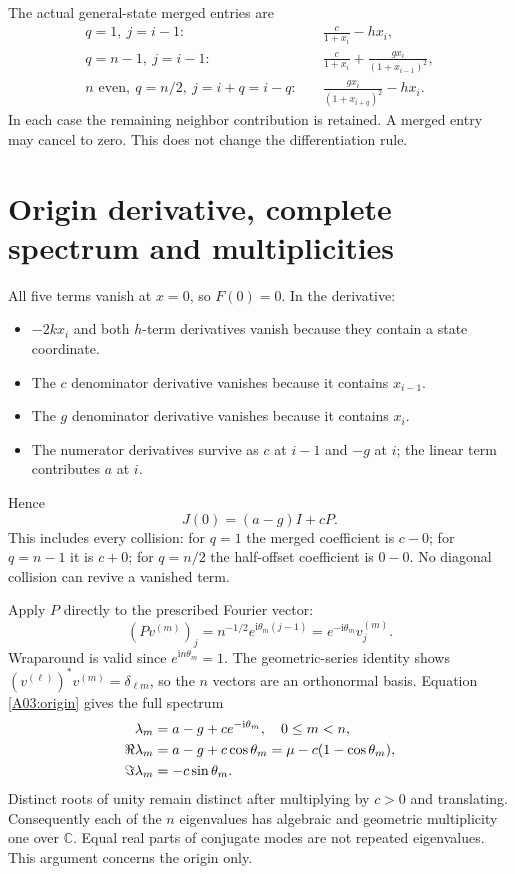 \documentclass[11pt]{article}
\newcommand{\CC}{\mathbb C}
\begin{document}
The actual general-state merged entries are
\begin{align*}
 q=1,\ j=i-1:&\quad \frac{c}{1+x_i}-h x_i,\\
 q=n-1,\ j=i-1:&\quad
              \frac{c}{1+x_i}+\frac{g x_i}{(1+x_{i-1})^2},\\
 n\text{ even},\ q=n/2,\ j=i+q=i-q:&\quad
              \frac{g x_i}{(1+x_{i+q})^2}-h x_i.
\end{align*}
In each case the remaining neighbor contribution is retained. A merged entry
may cancel to zero. This does not change the differentiation rule.

\section{Origin derivative, complete spectrum and multiplicities}
All five terms vanish at $x=0$, so $F(0)=0$. In the derivative:
\begin{itemize}
\item $-2kx_i$ and both $h$-term derivatives vanish because they contain a state coordinate.
\item The $c$ denominator derivative vanishes because it contains $x_{i-1}$.
\item The $g$ denominator derivative vanishes because it contains $x_i$.
\item The numerator derivatives survive as $c$ at $i-1$ and $-g$ at $i$; the linear term contributes $a$ at $i$.
\end{itemize}
Hence
\begin{equation}
 J(0)=(a-g)I+cP.\label{A03:origin}
\end{equation}
This includes every collision: for $q=1$ the merged coefficient is $c-0$;
for $q=n-1$ it is $c+0$; for $q=n/2$ the half-offset coefficient is $0-0$.
No diagonal collision can revive a vanished term.

Apply $P$ directly to the prescribed Fourier vector:
\[
 (Pv^{(m)})_j=n^{-1/2}e^{\mathrm i\theta_m(j-1)}
             =e^{-\mathrm i\theta_m}v^{(m)}_j.
\]
Wraparound is valid since $e^{\mathrm i n\theta_m}=1$. The geometric-series
identity shows $(v^{(\ell)})^*v^{(m)}=\delta_{\ell m}$, so the $n$ vectors
are an orthonormal basis. Equation \eqref{A03:origin} gives the full spectrum
\begin{align}
 \lambda_m&=a-g+c e^{-\mathrm i\theta_m},\quad 0\le m<n,\label{A03:spectrum}\\
 \Re\lambda_m&=a-g+c\cos\theta_m
              =\mu-c(1-\cos\theta_m),\notag\\
 \Im\lambda_m&=-c\sin\theta_m.\notag
\end{align}
Distinct roots of unity remain distinct after multiplying by $c>0$ and
translating. Consequently each of the $n$ eigenvalues has algebraic and
geometric multiplicity one over $\CC$. Equal real parts of conjugate modes
are not repeated eigenvalues. This argument concerns the origin only.
\end{document}
